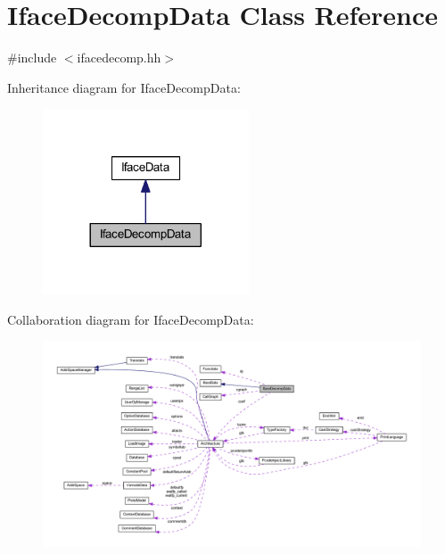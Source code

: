 \hypertarget{class_iface_decomp_data}{}\section{Iface\+Decomp\+Data Class Reference}
\label{class_iface_decomp_data}


{\ttfamily \#include $<$ifacedecomp.\+hh$>$}



Inheritance diagram for Iface\+Decomp\+Data\+:
\nopagebreak
\begin{figure}[H]
\begin{center}
\leavevmode
\includegraphics[width=173pt]{class_iface_decomp_data__inherit__graph}
\end{center}
\end{figure}


Collaboration diagram for Iface\+Decomp\+Data\+:
\nopagebreak
\begin{figure}[H]
\begin{center}
\leavevmode
\includegraphics[width=350pt]{class_iface_decomp_data__coll__graph}
\end{center}
\end{figure}
